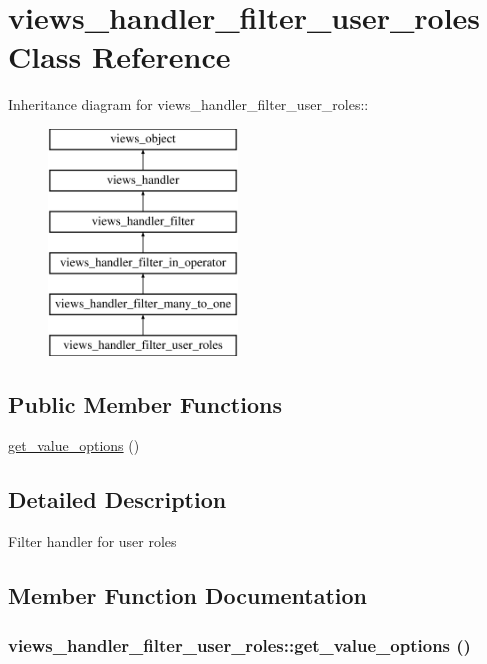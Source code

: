 \hypertarget{classviews__handler__filter__user__roles}{
\section{views\_\-handler\_\-filter\_\-user\_\-roles Class Reference}
\label{classviews__handler__filter__user__roles}
}
Inheritance diagram for views\_\-handler\_\-filter\_\-user\_\-roles::\begin{figure}[H]
\begin{center}
\leavevmode
\includegraphics[height=6cm]{classviews__handler__filter__user__roles}
\end{center}
\end{figure}
\subsection*{Public Member Functions}
\begin{CompactItemize}
\item 
\hyperlink{classviews__handler__filter__user__roles_9fcc092575dde958d1b50bb05c0243a3}{get\_\-value\_\-options} ()
\end{CompactItemize}


\subsection{Detailed Description}
Filter handler for user roles 

\subsection{Member Function Documentation}
\hypertarget{classviews__handler__filter__user__roles_9fcc092575dde958d1b50bb05c0243a3}{
\subsubsection[{get\_\-value\_\-options}]{\setlength{\rightskip}{0pt plus 5cm}views\_\-handler\_\-filter\_\-user\_\-roles::get\_\-value\_\-options ()}}
\label{classviews__handler__filter__user__roles_9fcc092575dde958d1b50bb05c0243a3}


